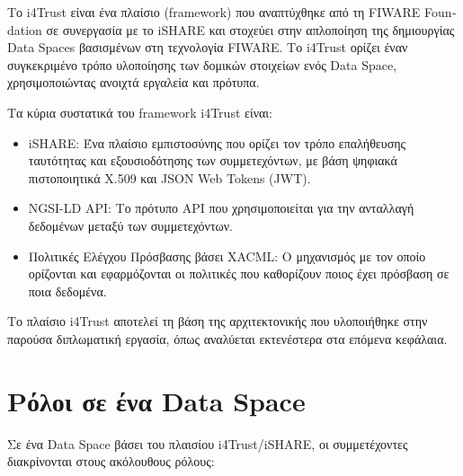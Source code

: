 Το \textlatin{i4Trust} είναι ένα πλαίσιο (\textlatin{framework}) που αναπτύχθηκε
από τη \textlatin{FIWARE Foundation} σε συνεργασία με το \textlatin{iSHARE} και
στοχεύει στην απλοποίηση της δημιουργίας \textlatin{Data Spaces} βασισμένων στη
τεχνολογία \textlatin{FIWARE}. Το \textlatin{i4Trust} ορίζει έναν συγκεκριμένο τρόπο
υλοποίησης των δομικών στοιχείων ενός \textlatin{Data Space}, χρησιμοποιώντας
ανοιχτά εργαλεία και πρότυπα.

Τα κύρια συστατικά του framework \textlatin{i4Trust} είναι:

\begin{itemize}
    \item \textlatin{iSHARE}: Ένα πλαίσιο εμπιστοσύνης που ορίζει τον τρόπο
    επαλήθευσης ταυτότητας και εξουσιοδότησης των συμμετεχόντων, με βάση ψηφιακά
    πιστοποιητικά \textlatin{X.509} και \textlatin{JSON Web Tokens (JWT)}.

    \item \textlatin{NGSI-LD API}: Το πρότυπο \textlatin{API} που
    χρησιμοποιείται για την ανταλλαγή δεδομένων μεταξύ των συμμετεχόντων.

    \item Πολιτικές Ελέγχου Πρόσβασης βάσει \textlatin{XACML}: Ο μηχανισμός
    με τον οποίο ορίζονται και εφαρμόζονται οι πολιτικές που καθορίζουν ποιος έχει
    πρόσβαση σε ποια δεδομένα.
\end{itemize}

Το πλαίσιο \textlatin{i4Trust} αποτελεί τη βάση της αρχιτεκτονικής που υλοποιήθηκε
στην παρούσα διπλωματική εργασία, όπως αναλύεται εκτενέστερα στα επόμενα κεφάλαια.

\section{Ρόλοι σε ένα \textlatin{Data Space}}
\label{sec:roles}

Σε ένα \textlatin{Data Space} βάσει του πλαισίου \textlatin{i4Trust}/\textlatin{iSHARE},
οι συμμετέχοντες διακρίνονται στους ακόλουθους ρόλους:

